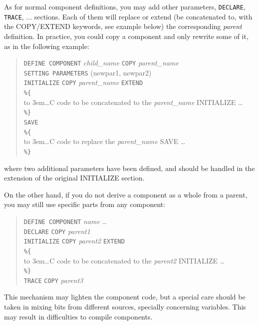 As for normal component definitions, you may add other parameters,
\texttt{DECLARE}, \texttt{TRACE}, ... sections. Each of them will replace or
extend (be concatenated to, with the COPY/EXTEND keywords, see example below)
the corresponding {\it parent} definition. In practice, you could copy a
component and only rewrite some of it, as in the following example:
\begin{quote}
  \texttt{DEFINE COMPONENT} {\it child\_name} \texttt{COPY} {\it parent\_name} \\

  \texttt{SETTING PARAMETERS} (newpar1, newpar2) \\
  \texttt{INITIALIZE} \texttt{COPY} {\it parent\_name} \texttt{EXTEND} \\
  \verb|%{|  \\
  \hbox to 3em{}\ldots C code to be concatenated to the {\it parent\_name} INITIALIZE \ldots  \\
  \verb|%}| \\
  \texttt{SAVE} \\
  \verb|%{|  \\
  \hbox to 3em{}\ldots C code to replace the {\it parent\_name} SAVE \ldots  \\
  \verb|%}| \\
\end{quote}
where two additional parameters have been defined, and should be handled in the
extension of the original INITIALIZE section.

On the other hand, if you do not derive a component as a whole from a parent,
you may still use specific parts from any component:
\begin{quote}
  \texttt{DEFINE COMPONENT} {\it name} \ldots \\
  \texttt{DECLARE} \texttt{COPY} {\it parent1} \\
  \texttt{INITIALIZE} \texttt{COPY} {\it parent2} \texttt{EXTEND} \\
  \verb|%{|  \\
  \hbox to 3em{}\ldots C code to be concatenated to the {\it parent2} INITIALIZE \ldots  \\
  \verb|%}| \\
  \texttt{TRACE} \texttt{COPY} {\it parent3}
\end{quote}

This mechanism may lighten the component code, but a special care should be taken in mixing bits from different sources, specially concerning variables. This may result in difficulties to compile components.

